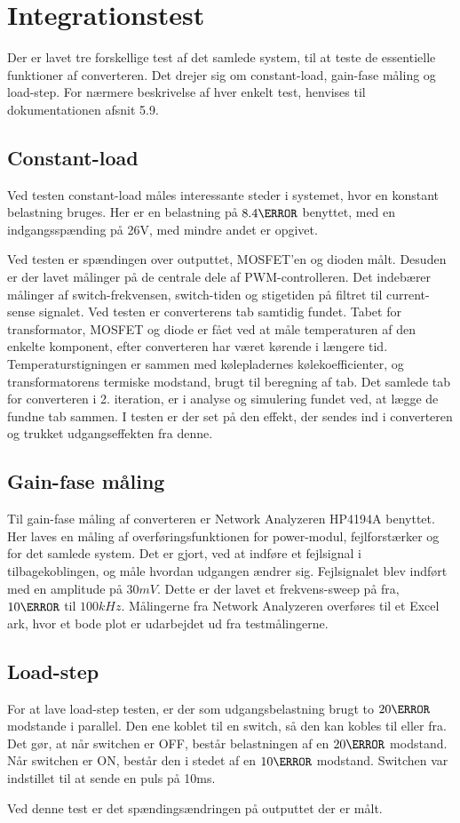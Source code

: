 

\section{Integrationstest} \label{Integrationstest}
Der er lavet tre forskellige test af det samlede system, til at teste de essentielle funktioner af converteren. Det drejer sig om constant-load, gain-fase måling og load-step. For nærmere beskrivelse af hver enkelt test, henvises til dokumentationen afsnit 5.9.

\subsection{Constant-load}
Ved testen constant-load måles interessante steder i systemet, hvor en konstant belastning bruges. Her er en belastning på $8.4\ohm$ benyttet, med en indgangsspænding på 26V, med mindre andet er opgivet.

Ved testen er spændingen over outputtet, MOSFET'en og dioden målt. Desuden er der lavet målinger på de centrale dele af PWM-controlleren. Det indebærer målinger af switch-frekvensen, switch-tiden og stigetiden på filtret til current-sense signalet.  
Ved testen er converterens tab samtidig fundet. Tabet for transformator, MOSFET og diode er fået ved at måle temperaturen af den enkelte komponent, efter converteren har været kørende i længere tid. Temperaturstigningen er sammen med kølepladernes kølekoefficienter, og transformatorens termiske modstand, brugt til beregning af tab. Det samlede tab for converteren i 2. iteration, er i analyse og simulering fundet ved, at lægge de fundne tab sammen. I testen er der set på den effekt, der sendes ind i converteren og trukket udgangseffekten fra denne.

\subsection{Gain-fase måling}
Til gain-fase måling af converteren er Network Analyzeren HP4194A\cite{hp4194} benyttet. Her laves en måling af overføringsfunktionen for power-modul, fejlforstærker og for det samlede system. Det er gjort, ved at indføre et fejlsignal i tilbagekoblingen, og måle hvordan udgangen ændrer sig. Fejlsignalet blev indført med en amplitude på $30mV$. Dette er der lavet et frekvens-sweep på fra, $10\Hz$ til $100kHz$. Målingerne fra Network Analyzeren overføres til et Excel ark, hvor et bode plot er udarbejdet ud fra testmålingerne. 

\subsection{Load-step}
For at lave load-step testen, er der som udgangsbelastning brugt to $20\ohm$ modstande i parallel. Den ene koblet til en switch, så den kan kobles til eller fra. Det gør, at når switchen er OFF, består belastningen af en $20\ohm$ modstand. Når switchen er ON, består den i stedet af en $10\ohm$ modstand. Switchen var indstillet til at sende en puls på 10ms.

\noindent Ved denne test er det spændingsændringen på outputtet der er målt.